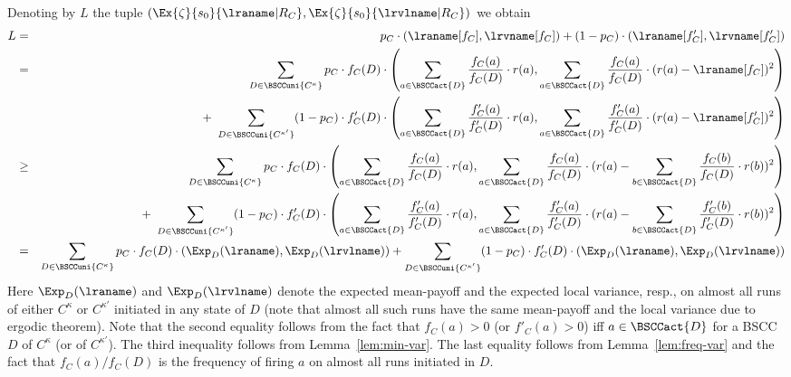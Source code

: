 Denoting by $L$ the tuple $(\Ex{\zeta}{s_0}{\lraname|R_C}, \Ex{\zeta}{s_0}{\lrvlname|R_C})$ we obtain
\begin{eqnarray*}
L & = & p_C\cdot (\lraname[f_C],\lrvname[f_C]) + (1-p_C)\cdot
 (\lraname[f'_C],\lrvname[f'_C]) \\
  & = & \sum_{D\in \BSCCuni{C^{\kappa}}} p_C\cdot f_C(D)\cdot \left(\sum_{a\in \BSCCact{D}} \frac{f_C(a)}{f_C(D)}\cdot r(a),\sum_{a\in \BSCCact{D}} \frac{f_C(a)}{f_C(D)}\cdot (r(a)-\lraname[f_C])^2\right) \\
  & & +\ \sum_{D\in \BSCCuni{C^{\kappa'}}} (1-p_C)\cdot f'_C(D)\cdot \left(\sum_{a\in \BSCCact{D}} \frac{f'_C(a)}{f'_C(D)}\cdot r(a),\sum_{a\in \BSCCact{D}} \frac{f'_C(a)}{f'_C(D)}\cdot (r(a)-\lraname[f'_C])^2\right) \\
& \geq & \sum_{D\in \BSCCuni{C^{\kappa}}} p_C\cdot f_C(D)\cdot \left(\sum_{a\in \BSCCact{D}} \frac{f_C(a)}{f_C(D)}\cdot r(a),\sum_{a\in \BSCCact{D}} \frac{f_C(a)}{f_C(D)}\cdot (r(a)-\sum_{b\in \BSCCact{D}} \frac{f_C(b)}{f_C(D)}\cdot r(b))^2\right) \\
  & & +\ \sum_{D\in \BSCCuni{C^{\kappa'}}} (1-p_C)\cdot f'_C(D)\cdot \left(\sum_{a\in \BSCCact{D}} \frac{f'_C(a)}{f'_C(D)}\cdot r(a),\sum_{a\in \BSCCact{D}} \frac{f'_C(a)}{f'_C(D)}\cdot (r(a)-\sum_{b\in \BSCCact{D}} \frac{f'_C(b)}{f'_C(D)}\cdot r(b))^2\right) \\
  & = & \sum_{D\in \BSCCuni{C^{\kappa}}} p_C\cdot f_C(D)\cdot \left(\Exp_D(\lraname),\Exp_D(\lrvlname)\right)
    + \sum_{D\in \BSCCuni{C^{\kappa'}}} (1-p_C)\cdot f'_C(D)\cdot \left(\Exp_{D}(\lraname),\Exp_{D}(\lrvlname)\right) \\
\end{eqnarray*}
Here $\Exp_D(\lraname)$ and $\Exp_D(\lrvlname)$ denote the expected mean-payoff and the expected local variance, resp., on almost all runs of either $C^{\kappa}$ or $C^{\kappa'}$ initiated in any state of $D$ (note that almost all such runs have the same mean-payoff and the local variance due to ergodic theorem).
Note that the second equality follows from the fact that $f_C(a)>0$ (or $f'_C(a)>0$) iff $a\in \BSCCact{D}$ for a BSCC $D$ of $C^{\kappa}$ (or of $C^{\kappa'}$). The third inequality follows from Lemma~\ref{lem:min-var}. The last equality follows from Lemma~\ref{lem:freq-var} and the fact that $f_C(a)/f_C(D)$ is the frequency of firing $a$ on almost all runs initiated in $D$.

